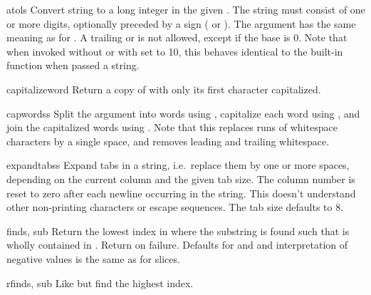 \begin{funcdesc}{atol}{s}
  Convert string  to a long integer in the given .
  The string must consist of one or more digits, optionally preceded
  by a sign (\samp{+} or \samp{-}).  The  argument has the
  same meaning as for .  A trailing  or
   is not allowed, except if the base is 0.  Note that when
  invoked without  or with  set to 10, this
  behaves identical to the built-in function
   when passed a string.
\end{funcdesc}

\begin{funcdesc}{capitalize}{word}
  Return a copy of  with only its first character capitalized.
\end{funcdesc}

\begin{funcdesc}{capwords}{s}
  Split the argument into words using , capitalize
  each word using , and join the capitalized
  words using .  Note that this replaces runs of
  whitespace characters by a single space, and removes leading and
  trailing whitespace.
\end{funcdesc}

\begin{funcdesc}{expandtabs}{s}
  Expand tabs in a string, i.e.\ replace them by one or more spaces,
  depending on the current column and the given tab size.  The column
  number is reset to zero after each newline occurring in the string.
  This doesn't understand other non-printing characters or escape
  sequences.  The tab size defaults to 8.
\end{funcdesc}

\begin{funcdesc}{find}{s, sub}
  Return the lowest index in  where the substring  is
  found such that  is wholly contained in
  .  Return  on failure.
  Defaults for  and  and interpretation of
  negative values is the same as for slices.
\end{funcdesc}

\begin{funcdesc}{rfind}{s, sub}
  Like  but find the highest index.
\end{funcdesc}


